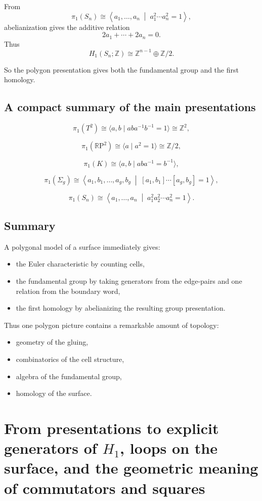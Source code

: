 \documentclass[12pt,a4paper]{article}
\newcommand{\RP}{\mathbb{R}\mathrm{P}}
\newcommand{\Z}{\mathbb{Z}}
\theoremstyle{notespace}
\begin{document}
From
\[
\pi_1(S_n)\cong
\left\langle
a_1,\dots,a_n
\;\middle|\;
a_1^2\cdots a_n^2=1
\right\rangle,
\]
abelianization gives the additive relation
\[
2a_1+\cdots+2a_n=0.
\]
Thus
\[
H_1(S_n;\Z)\cong \Z^{n-1}\oplus \Z/2.
\]

So the polygon presentation gives both the fundamental group and the first homology.

\subsection{A compact summary of the main presentations}

\[
\pi_1(T^2)\cong \langle a,b\mid aba^{-1}b^{-1}=1\rangle \cong \Z^2,
\]

\[
\pi_1(\RP^2)\cong \langle a\mid a^2=1\rangle \cong \Z/2,
\]

\[
\pi_1(K)\cong \langle a,b\mid aba^{-1}=b^{-1}\rangle,
\]

\[
\pi_1(\Sigma_g)\cong
\left\langle
a_1,b_1,\dots,a_g,b_g
\;\middle|\;
[a_1,b_1]\cdots [a_g,b_g]=1
\right\rangle,
\]

\[
\pi_1(S_n)\cong
\left\langle
a_1,\dots,a_n
\;\middle|\;
a_1^2a_2^2\cdots a_n^2=1
\right\rangle.
\]

\subsection{Summary}

A polygonal model of a surface immediately gives:
\begin{itemize}
	\item the Euler characteristic by counting cells,
	\item the fundamental group by taking generators from the edge-pairs and one relation from the boundary word,
	\item the first homology by abelianizing the resulting group presentation.
\end{itemize}

Thus one polygon picture contains a remarkable amount of topology:
\begin{itemize}
	\item geometry of the gluing,
	\item combinatorics of the cell structure,
	\item algebra of the fundamental group,
	\item homology of the surface.
\end{itemize}

\section{From presentations to explicit generators of \(H_1\), loops on the surface, and the geometric meaning of commutators and squares}
\end{document}
